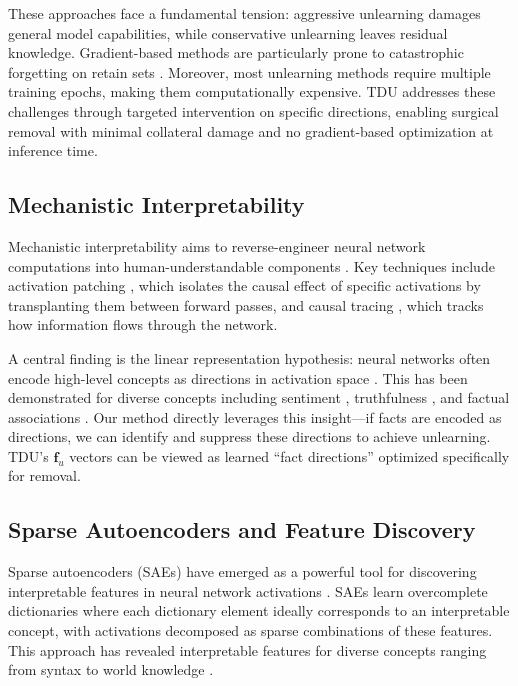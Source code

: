These approaches face a fundamental tension: aggressive unlearning damages general model capabilities, while conservative unlearning leaves residual knowledge. Gradient-based methods are particularly prone to catastrophic forgetting on retain sets \citep{shi2024muse}. Moreover, most unlearning methods require multiple training epochs, making them computationally expensive. TDU addresses these challenges through targeted intervention on specific directions, enabling surgical removal with minimal collateral damage and no gradient-based optimization at inference time.

\subsection{Mechanistic Interpretability}

Mechanistic interpretability aims to reverse-engineer neural network computations into human-understandable components \citep{olah2020zoom, elhage2021mathematical}. Key techniques include activation patching \citep{vig2020investigating, meng2022locating}, which isolates the causal effect of specific activations by transplanting them between forward passes, and causal tracing \citep{pearl2009causality, meng2022locating}, which tracks how information flows through the network.

A central finding is the linear representation hypothesis: neural networks often encode high-level concepts as directions in activation space \citep{mikolov2013linguistic, park2023linear, nanda2023emergent}. This has been demonstrated for diverse concepts including sentiment \citep{tigges2023linear}, truthfulness \citep{marks2023geometry, li2024inference}, and factual associations \citep{hernandez2024linearity, geva2023dissecting}. Our method directly leverages this insight---if facts are encoded as directions, we can identify and suppress these directions to achieve unlearning. TDU's $\mathbf{f}_u$ vectors can be viewed as learned ``fact directions'' optimized specifically for removal.

\subsection{Sparse Autoencoders and Feature Discovery}

Sparse autoencoders (SAEs) have emerged as a powerful tool for discovering interpretable features in neural network activations \citep{cunningham2023sparse, bricken2023monosemanticity}. SAEs learn overcomplete dictionaries where each dictionary element ideally corresponds to an interpretable concept, with activations decomposed as sparse combinations of these features. This approach has revealed interpretable features for diverse concepts ranging from syntax to world knowledge \citep{templeton2024scaling, gao2024scaling}.

